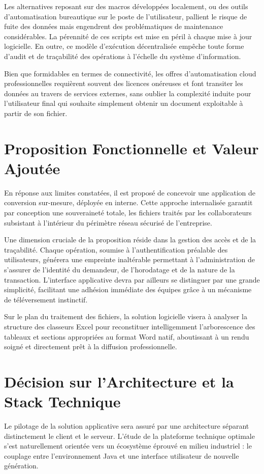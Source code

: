 \documentclass[11pt,a4paper]{article}
\begin{document}
Les alternatives reposant sur des macros développées localement, ou des outils d'automatisation bureautique sur le poste de l'utilisateur, pallient le risque de fuite des données mais engendrent des problématiques de maintenance considérables. La pérennité de ces scripts est mise en péril à chaque mise à jour logicielle. En outre, ce modèle d'exécution décentralisée empêche toute forme d'audit et de traçabilité des opérations à l'échelle du système d'information.

Bien que formidables en termes de connectivité, les offres d'automatisation cloud professionnelles requièrent souvent des licences onéreuses et font transiter les données au travers de services externes, sans oublier la complexité induite pour l'utilisateur final qui souhaite simplement obtenir un document exploitable à partir de son fichier.

\section{Proposition Fonctionnelle et Valeur Ajoutée}
En réponse aux limites constatées, il est proposé de concevoir une application de conversion sur-mesure, déployée en interne. Cette approche internalisée garantit par conception une souveraineté totale, les fichiers traités par les collaborateurs subsistant à l'intérieur du périmètre réseau sécurisé de l'entreprise.

Une dimension cruciale de la proposition réside dans la gestion des accès et de la traçabilité. Chaque opération, soumise à l'authentification préalable des utilisateurs, générera une empreinte inaltérable permettant à l'administration de s'assurer de l'identité du demandeur, de l'horodatage et de la nature de la transaction. L'interface applicative devra par ailleurs se distinguer par une grande simplicité, facilitant une adhésion immédiate des équipes grâce à un mécanisme de téléversement instinctif.

Sur le plan du traitement des fichiers, la solution logicielle visera à analyser la structure des classeurs Excel pour reconstituer intelligemment l'arborescence des tableaux et sections appropriées au format Word natif, aboutissant à un rendu soigné et directement prêt à la diffusion professionnelle.

\section{Décision sur l'Architecture et la Stack Technique}
Le pilotage de la solution applicative sera assuré par une architecture séparant distinctement le client et le serveur. L'étude de la plateforme technique optimale s'est naturellement orientée vers un écosystème éprouvé en milieu industriel : le couplage entre l'environnement Java et une interface utilisateur de nouvelle génération.
\end{document}
